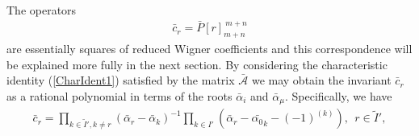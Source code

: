 \documentclass[12pt]{article}
\begin{document}
The operators
\begin{align*}
\bar{c}_r = \bar{P}[r]_{m+n}^{\ m+n}
\end{align*}
are essentially squares of reduced Wigner coefficients and this correspondence will be explained more fully in the next section. By considering the characteristic identity (\ref{CharIdent1}) satisfied by the matrix $\bar{\mathcal{A}}$ we may obtain the invariant $\bar{c}_r$ as a rational polynomial in terms of the roots $\bar{\alpha}_i$ and $\bar{\alpha}_\mu$. Specifically, we have \cite{GIW1}
\begin{align}
\bar{c}_r = \prod_{k\in \tilde{I}',k\neq r} \left(\bar{\alpha}_r - \bar{\alpha}_k\right)^{-1}\prod_{k\in
I'} \left(\bar{\alpha}_r - \bar{\alpha_0}_k - (-1)^{(k)}\right),\ \ r\in \tilde{I}',
\label{barseer}
\end{align}
\end{document}
